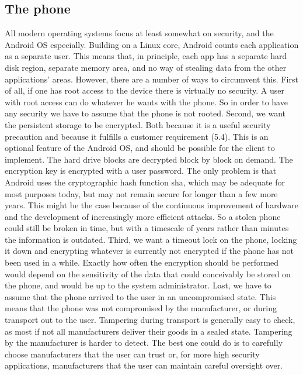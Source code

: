 \subsection{The phone}
All modern operating systems focus at least somewhat on security, and the Android OS especially. Building on a Linux core, Android counts each application as a separate user. This means that, in principle, each app has a separate hard disk region, separate memory area, and no way of stealing data from the other applications’ areas. However, there are a number of ways to circumvent this.
\newline
\newline
First of all, if one has root access to the device there is virtually no security. A user with root access can do whatever he wants with the phone. So in order to have any security we have to assume that the phone is not rooted.
\newline
\newline
Second, we want the persistent storage to be encrypted. Both because it is a useful security precaution and because it fulfills a customer requirement (5.4). This is an optional feature of the Android OS, and should be possible for the client to implement. The hard drive blocks are decrypted block by block on demand. The encryption key is encrypted with a user password. The only problem is that Android uses the cryptographic hash function \gls{sha}, which may be adequate for most purposes today, but may not remain secure for longer than a few more years. This might be the case because of the continuous improvement of hardware and the development of increasingly more efficient attacks. So a stolen phone could still be broken in time, but with a timescale of years rather than minutes the information is outdated. 
\newline
\newline
Third, we want a timeout lock on the phone, locking it down and encrypting whatever is currently not encrypted if the phone has not been used in a while. Exactly how often the encryption should be performed would depend on the sensitivity of the data that could conceivably be stored on the phone, and would be up to the system administrator.
Last, we have to assume that the phone arrived to the user in an uncompromised state. This means that the phone was not compromised by the manufacturer, or during transport out to the user. Tampering during transport is generally easy to check, as most if not all manufacturers deliver their goods in a sealed state. Tampering by the manufacturer is harder to detect. The best one could do is to carefully choose manufacturers that the user can trust or, for more high security applications, manufacturers that the user can maintain careful oversight over.

